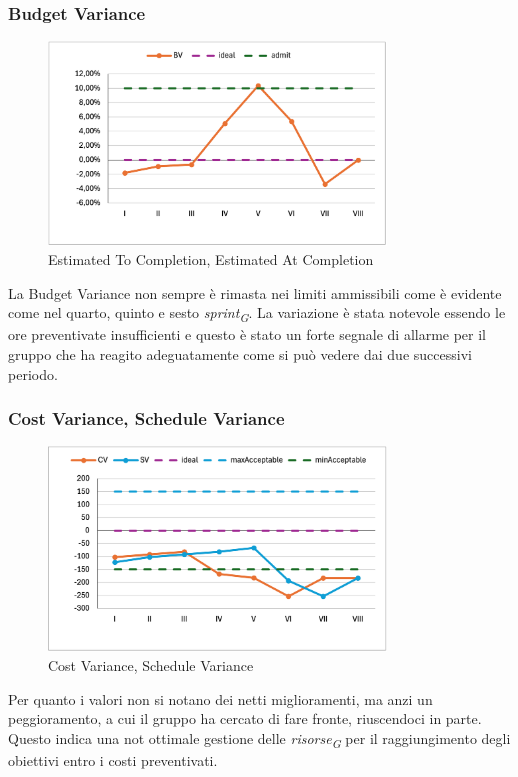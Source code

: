 \subsubsection{Budget Variance}
\begin{figure}[H]
    \centering
    \includegraphics[width=0.8\textwidth]{./images/BV.png}
    \caption{Estimated To Completion, Estimated At Completion}
\end{figure}
La Budget Variance non sempre è rimasta nei limiti ammissibili come è evidente come nel quarto, quinto e sesto \textit{sprint\textsubscript{G}}. La variazione è stata notevole essendo le ore preventivate  insufficienti e questo è stato un forte segnale di allarme per il gruppo che ha reagito adeguatamente come si può vedere dai due successivi periodo.

\subsubsection{Cost Variance, Schedule Variance}
\begin{figure}[H]
    \centering
    \includegraphics[width=0.8\textwidth]{./images/CV-SV.png}
    \caption{Cost Variance, Schedule Variance}
\end{figure}
Per quanto i valori non si notano dei netti miglioramenti, ma anzi un peggioramento, a cui il gruppo ha cercato di fare fronte, riuscendoci in parte. Questo indica una not ottimale gestione delle \textit{risorse\textsubscript{G}} per il raggiungimento degli obiettivi entro i costi preventivati.

